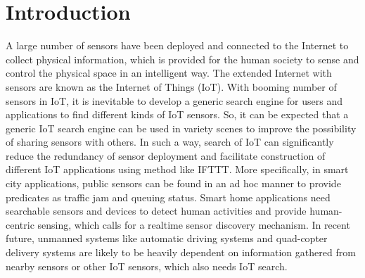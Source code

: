 \documentclass[conference]{IEEEtran}
\begin{document}
\section{Introduction} \label{introduction}
A large number of sensors have been deployed and connected to the Internet to collect physical information, which is provided for the human society to sense and control the physical space in an intelligent way. 
The extended Internet with sensors are known as the Internet of Things (IoT). 
With booming number of sensors in IoT, it is inevitable to develop a generic search engine for users and applications to find different kinds of IoT sensors. 
So, it can be expected that a generic IoT search engine can be used in variety scenes to improve the possibility of sharing sensors with others.
In such a way, search of IoT can significantly reduce the redundancy of sensor deployment and facilitate construction of different IoT applications using method like IFTTT\cite{ifttt}.
More specifically, in smart city applications, public sensors can be found in an ad hoc manner to provide predicates as traffic jam and queuing status. 
Smart home applications need searchable sensors and devices to detect human activities and provide human-centric sensing, which calls for a realtime sensor discovery mechanism. In recent future, unmanned systems like automatic driving systems and quad-copter delivery systems are likely to be heavily dependent on information gathered from nearby sensors or other IoT sensors, which also needs IoT search. 
\end{document}
